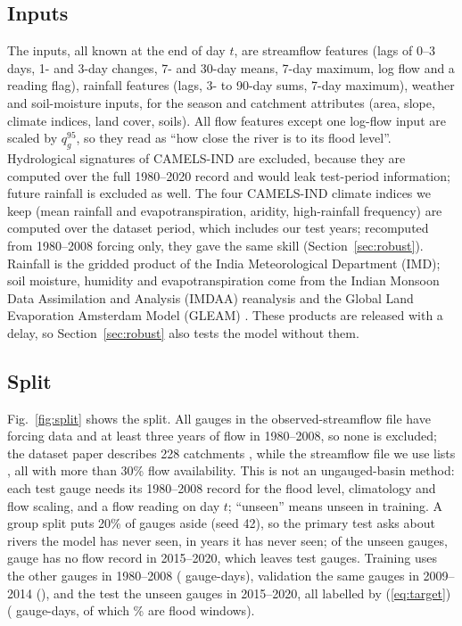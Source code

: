 \documentclass[conference]{IEEEtran}
\begin{document}
\subsection{Inputs}
The \NFeat{} inputs, all known at the end of day $t$, are \GroupFlow{} streamflow features (lags of 0--3 days, 1- and 3-day changes, 7- and 30-day means, 7-day maximum, log flow and a reading flag), \GroupRain{} rainfall features (lags, 3- to 90-day sums, 7-day maximum), \GroupWeather{} weather and \GroupSoil{} soil-moisture inputs, \GroupSeason{} for the season and \GroupStatic{} catchment attributes (area, slope, climate indices, land cover, soils). All flow features except one log-flow input are scaled by $q^{95}_g$, so they read as ``how close the river is to its flood level''. Hydrological signatures of CAMELS-IND are excluded, because they are computed over the full 1980--2020 record and would leak test-period information; future rainfall is excluded as well. The four CAMELS-IND climate indices we keep (mean rainfall and evapotranspiration, aridity, high-rainfall frequency) are computed over the dataset period, which includes our test years; recomputed from 1980--2008 forcing only, they gave the same skill (Section~\ref{sec:robust}). Rainfall is the gridded product of the India Meteorological Department (IMD); soil moisture, humidity and evapotranspiration come from the Indian Monsoon Data Assimilation and Analysis (IMDAA) reanalysis and the Global Land Evaporation Amsterdam Model (GLEAM) \cite{Mangukiya2025}. These products are released with a delay, so Section~\ref{sec:robust} also tests the model without them.

\subsection{Split}
Fig.~\ref{fig:split} shows the split. All \NGauges{} gauges in the observed-streamflow file have forcing data and at least three years of flow in 1980--2008, so none is excluded; the dataset paper describes 228 catchments \cite{Mangukiya2025}, while the streamflow file we use lists \NGauges, all with more than 30\% flow availability. This is not an ungauged-basin method: each test gauge needs its 1980--2008 record for the flood level, climatology and flow scaling, and a flow reading on day $t$; ``unseen'' means unseen in training. A group split puts 20\% of gauges aside (seed 42), so the primary test asks about rivers the model has never seen, in years it has never seen; of the \NUnseen{} unseen gauges, \UnseenNoRows{} gauge has no flow record in 2015--2020, which leaves \NTestGauges{} test gauges. Training uses the other gauges in 1980--2008 (\NTrainRows{} gauge-days), validation the same gauges in 2009--2014 (\NValRows), and the test the unseen gauges in 2015--2020, all labelled by (\ref{eq:target}) (\NTestRows{} gauge-days, of which \PosRate\% are flood windows).
\end{document}
